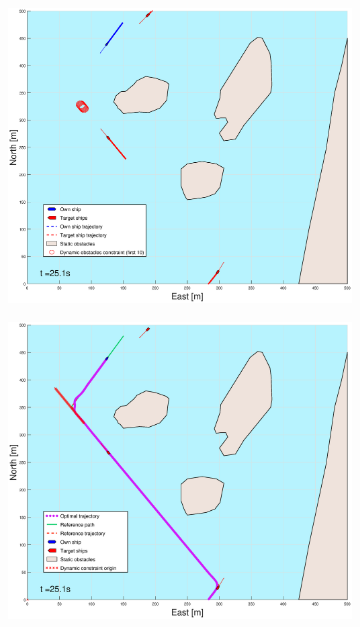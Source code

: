 \clearpage
\begin{figure}[!ht] %
    \begin{subfigure}[b]{0.49\textwidth}
        \centering
        \includegraphics[width=\textwidth]{Images/Figures/Helloya_Rev/_Simple_1fig1_time=25}
    \end{subfigure}
    \hfill
    \begin{subfigure}[b]{0.499\textwidth}
        \centering
        \includegraphics[width=\textwidth]{Images/Figures/Helloya_Rev/_Simple_1fig999_time=25}

\end{subfigure}
\end{figure}
